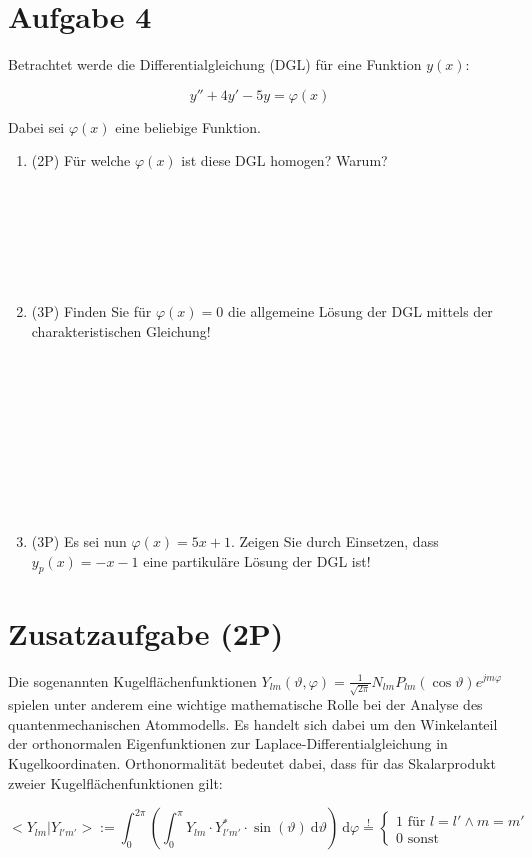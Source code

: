 \documentclass[12pt]{article}
\providecommand\d{}
\renewcommand{\d}[1]{\:\mathrm{d}{#1}}
\begin{document}
\newpage
\section* {Aufgabe 4}

Betrachtet werde die Differentialgleichung (DGL) für eine Funktion $y(x)$:

$$y''+4y'-5y=\varphi(x)$$

Dabei sei $\varphi(x)$ eine beliebige Funktion.

\begin{enumerate}[label=(\alph*)]
\item (2P) Für welche $\varphi(x)$ ist diese DGL homogen? Warum?
\\
\\
\\
\\
\\
\\
\\
\item (3P) Finden Sie für $\varphi(x)=0$ die allgemeine Lösung der DGL mittels der charakteristischen Gleichung! 
\\
\\
\\
\\
\\
\\
\\
\\
\\
\\
\item (3P) Es sei nun $\varphi(x)=5x+1$. Zeigen Sie durch Einsetzen, dass $y_p(x)=-x-1$ eine partikuläre Lösung der DGL ist!
\end{enumerate}

\newpage
\section*{Zusatzaufgabe (2P)}

Die sogenannten Kugelflächenfunktionen $Y_{lm}(\vartheta,\varphi)=\frac{1}{\sqrt{2\pi}}N_{lm}P_{lm}(\cos \vartheta)e^{jm\varphi}$ spielen unter anderem eine wichtige mathematische Rolle bei der Analyse des quantenmechanischen Atommodells. Es handelt sich dabei um den Winkelanteil der orthonormalen Eigenfunktionen zur Laplace-Differentialgleichung in Kugelkoordinaten. Orthonormalität bedeutet dabei, dass für das Skalarprodukt zweier Kugelflächenfunktionen gilt:

$$
<Y_{lm}|Y_{l'm'}> := \int_0^{2\pi}\left(\int_0^{\pi}Y_{lm}\cdot Y^{*}_{l'm'}\cdot \sin(\vartheta)\d{\vartheta}\right)\d{\varphi} \stackrel{!}{=} 
\begin{cases}
1 \text{ für } l=l' \land m=m'\\
0 \text{ sonst}
\end{cases}
$$
\end{document}
